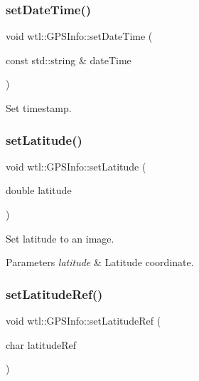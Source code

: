\subsubsection{\texorpdfstring{set\+Date\+Time()}{setDateTime()}}
{\footnotesize\ttfamily void wtl\+::\+G\+P\+S\+Info\+::set\+Date\+Time (\begin{DoxyParamCaption}\item[{const std\+::string \&}]{date\+Time }\end{DoxyParamCaption})}



Set timestamp. 

\mbox{\label{classwtl_1_1_g_p_s_info_a5cda2231162f5619bb6b688d70b568ad}} 
\subsubsection{\texorpdfstring{set\+Latitude()}{setLatitude()}}
{\footnotesize\ttfamily void wtl\+::\+G\+P\+S\+Info\+::set\+Latitude (\begin{DoxyParamCaption}\item[{double}]{latitude }\end{DoxyParamCaption})}



Set latitude to an image. 


\begin{DoxyParams}{Parameters}
{\em latitude} & Latitude coordinate. \\
\hline
\end{DoxyParams}
\mbox{\label{classwtl_1_1_g_p_s_info_aef74bb3944920343030625b8265bda91}} 
\subsubsection{\texorpdfstring{set\+Latitude\+Ref()}{setLatitudeRef()}}
{\footnotesize\ttfamily void wtl\+::\+G\+P\+S\+Info\+::set\+Latitude\+Ref (\begin{DoxyParamCaption}\item[{char}]{latitude\+Ref }\end{DoxyParamCaption})}



